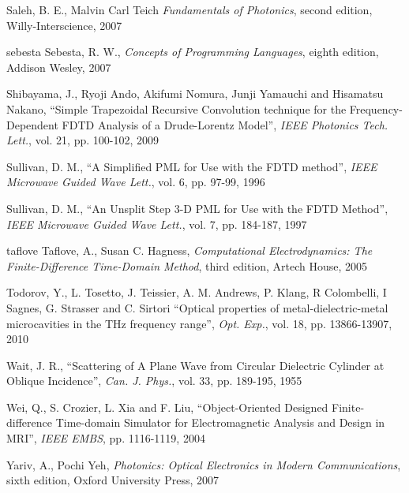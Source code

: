 \begin{thebibliography}{999}
  \bibitem
  {}
  Saleh, B. E., Malvin Carl Teich
  \textit{Fundamentals of Photonics}, second edition,
  Willy-Interscience,
  2007

  \bibitem
  {sebesta}
  Sebesta, R. W.,
  \textit{Concepts of Programming Languages}, eighth edition,
  Addison Wesley,
  2007

  \bibitem
  {}  
  Shibayama, J., Ryoji Ando, Akifumi Nomura, Junji Yamauchi and Hisamatsu Nakano,
  ``Simple Trapezoidal Recursive Convolution technique for the Frequency-Dependent FDTD Analysis of a Drude-Lorentz Model'',
  \textit{IEEE Photonics Tech. Lett.},
  vol. 21,
  pp. 100-102,
  2009

  \bibitem
  {}
  Sullivan, D. M.,
  ``A Simplified PML for Use with the FDTD method'',
  \textit{IEEE Microwave Guided Wave Lett.},
  vol. 6,
  pp. 97-99,
  1996

  \bibitem
  {}
  Sullivan, D. M.,
  ``An Unsplit Step 3-D PML for Use with the FDTD Method'',
  \textit{IEEE Microwave Guided Wave Lett.}, 
  vol. 7,
  pp. 184-187,
  1997

  \bibitem
  {taflove}
  Taflove, A., Susan C. Hagness, 
  \textit{Computational Electrodynamics: The Finite-Difference Time-Domain Method}, third edition,
  Artech House,
  2005

  \bibitem
  {}
  Todorov, Y., L. Tosetto, J. Teissier, A. M. Andrews, P. Klang, R Colombelli, I Sagnes, G. Strasser and C. Sirtori
  ``Optical properties of metal-dielectric-metal microcavities in the THz frequency range'',
  \textit{Opt. Exp.},
  vol. 18,
  pp. 13866-13907,
  2010

  \bibitem
  {}
  Wait, J. R.,
  ``Scattering of A Plane Wave from Circular Dielectric Cylinder at Oblique Incidence'',
  \textit{Can. J. Phys.},
  vol. 33,
  pp. 189-195,
  1955

  \bibitem
  {}
  Wei, Q., S. Crozier, L. Xia and F. Liu,
  ``Object-Oriented Designed Finite-difference Time-domain Simulator for Electromagnetic Analysis and Design in MRI'',
  \textit{IEEE EMBS},
  pp. 1116-1119,
  2004

  \bibitem
  {}
  Yariv, A., Pochi Yeh,
  \textit{Photonics: Optical Electronics in Modern Communications}, sixth edition,
  Oxford University Press, 
  2007

\end{thebibliography}
